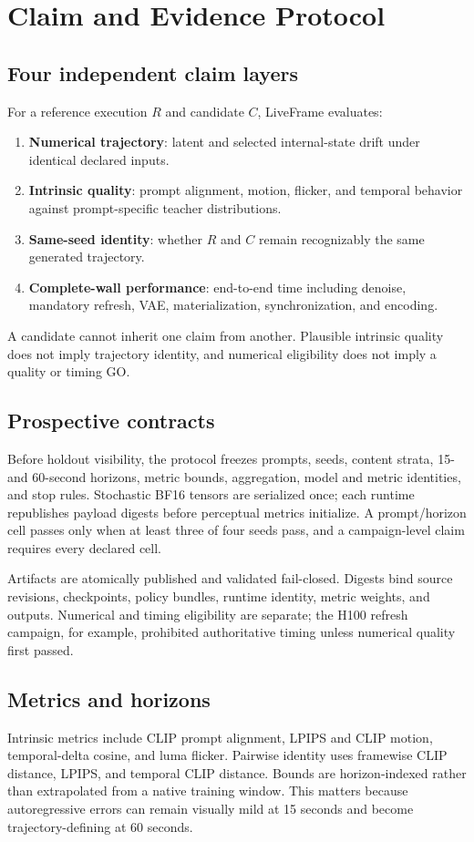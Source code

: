 \documentclass[10pt,twocolumn]{article}
\newcommand{\system}{LiveFrame}
\begin{document}
\section{Claim and Evidence Protocol}
\subsection{Four independent claim layers}
For a reference execution $R$ and candidate $C$, \system{} evaluates:
\begin{enumerate}[leftmargin=*,itemsep=1pt]
  \item \textbf{Numerical trajectory}: latent and selected internal-state drift under identical declared inputs.
  \item \textbf{Intrinsic quality}: prompt alignment, motion, flicker, and temporal behavior against prompt-specific teacher distributions.
  \item \textbf{Same-seed identity}: whether $R$ and $C$ remain recognizably the same generated trajectory.
  \item \textbf{Complete-wall performance}: end-to-end time including denoise, mandatory refresh, VAE, materialization, synchronization, and encoding.
\end{enumerate}
A candidate cannot inherit one claim from another. Plausible intrinsic quality does not imply trajectory identity, and numerical eligibility does not imply a quality or timing GO.

\subsection{Prospective contracts}
Before holdout visibility, the protocol freezes prompts, seeds, content strata, 15- and 60-second horizons, metric bounds, aggregation, model and metric identities, and stop rules. Stochastic BF16 tensors are serialized once; each runtime republishes payload digests before perceptual metrics initialize. A prompt/horizon cell passes only when at least three of four seeds pass, and a campaign-level claim requires every declared cell.

Artifacts are atomically published and validated fail-closed. Digests bind source revisions, checkpoints, policy bundles, runtime identity, metric weights, and outputs. Numerical and timing eligibility are separate; the H100 refresh campaign, for example, prohibited authoritative timing unless numerical quality first passed.

\subsection{Metrics and horizons}
Intrinsic metrics include CLIP prompt alignment, LPIPS and CLIP motion, temporal-delta cosine, and luma flicker. Pairwise identity uses framewise CLIP distance, LPIPS, and temporal CLIP distance. Bounds are horizon-indexed rather than extrapolated from a native training window. This matters because autoregressive errors can remain visually mild at 15 seconds and become trajectory-defining at 60 seconds.
\end{document}
